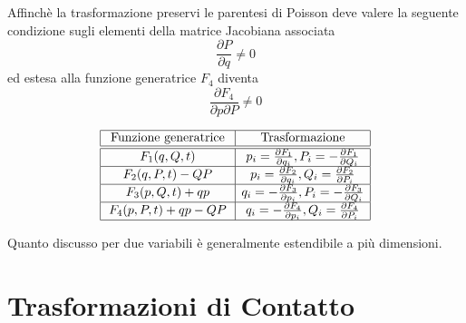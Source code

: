 Affinch\`{e} la trasformazione preservi le parentesi di Poisson deve valere la seguente condizione sugli elementi della matrice Jacobiana associata 
\begin{equation}
	\frac{\partial P}{\partial q} \neq 0
\end{equation}
ed estesa alla funzione generatrice $F_4$ diventa 
\begin{equation}
	\frac{\partial F_4}{ \partial p \partial P}\neq 0
\end{equation}

\renewcommand\arraystretch{1.6}
\begin{align*}
\begin{array}{|c|c|}
\hline \text { Funzione generatrice } & \text { Trasformazione  } \\
\hline \hline F_1(q, Q, t) & p_i=\frac{\partial F_1}{\partial q_i}, P_i=-\frac{\partial F_1}{\partial Q_i} \\
\hline F_2(q, P, t) - QP & p_i=\frac{\partial F_2}{\partial q_i}, Q_i=\frac{\partial F_2}{\partial P_i} \\
\hline F_3(p, Q, t) + qp & q_i=-\frac{\partial F_3}{\partial p_i}, P_i=-\frac{\partial F_3}{\partial Q_i} \\
\hline F_4(p, P, t) +qp -QP & q_i=-\frac{\partial F_4}{\partial p_i}, Q_i=\frac{\partial F_4}{\partial P_i} \\
\hline
\end{array}
\end{align*}
\newline
\begin{remark}
	Quanto discusso per due variabili \`{e} generalmente estendibile a pi\`{u} dimensioni.
\end{remark}

\section{Trasformazioni di Contatto}

